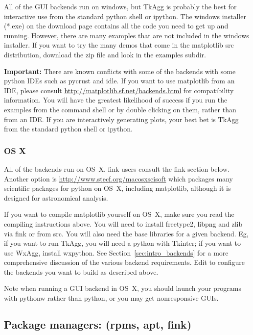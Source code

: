 \documentclass[twoside]{book}
\begin{document}
All of the GUI backends run on windows, but TkAgg is probably the best
for interactive use from the standard python shell or ipython.  The
windows installer (*.exe) on the download page contains all the code
you need to get up and running.  However, there are many examples that
are not included in the windows installer.  If you want to try the
many demos that come in the matplotlib src distribution, download the
zip file and look in the examples subdir.

\textbf{Important:} There are known conflicts with some of the
backends with some python IDEs such as pycrust and idle.  If you want to
use matplotlib from an IDE, please consult
\url{http://matplotlib.sf.net/backends.html} for compatibility
information.  You will have the greatest likelihood of success if you
run the examples from the command shell or by double clicking on them,
rather than from an IDE.  If you are interactively generating plots,
your best bet is TkAgg from the standard python shell or ipython.

\subsubsection{OS X}
\label{sec:osx}

All of the backends run on OS~X.  fink users consult the fink section
below.  Another option is \url{http://www.stecf.org/macosxscisoft}
which packages many scientific packages for python on OS~X, including
matplotlib, although it is designed for astronomical analysis.

If you want to compile matplotlib yourself on OS~X, make sure you read the
compiling instructions above.  You will need to install freetype2,
libpng and zlib via fink or from src.  You will also need the base
libraries for a given backend.  Eg, if you want to run TkAgg, you will
need a python with Tkinter; if you want to use WxAgg, install
wxpython.  See Section~\ref{sec:intro_backends} for a more comprehensive
discussion of the various backend requirements.  Edit 
to configure the backends you want to build as described above.

Note when running a GUI backend in OS~X, you should launch your
programs with pythonw rather than python, or you may get
nonresponsive GUIs.

\subsection{Package managers: (rpms, apt, fink)}
\end{document}
